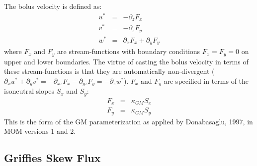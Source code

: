 \documentclass[12pt]{article}
\begin{document}
The bolus velocity is defined as:
\begin{eqnarray}
u^* & = & - \partial_z F_x \\
v^* & = & - \partial_z F_y \\
w^* & = & \partial_x F_x + \partial_y F_y
\end{eqnarray}
where $F_x$ and $F_y$ are stream-functions with boundary conditions
$F_x=F_y=0$ on upper and lower boundaries. The virtue of casting the
bolus velocity in terms of these stream-functions is that they are
automatically non-divergent ($\partial_x u^* + \partial_y v^* = -
\partial_{xz} F_x - \partial_{yz} F_y = - \partial_z w^*$). $F_x$ and
$F_y$ are specified in terms of the isoneutral slopes $S_x$ and $S_y$:
\begin{eqnarray}
F_x & = & \kappa_{GM} S_x \\
F_y & = & \kappa_{GM} S_y
\end{eqnarray}
This is the form of the GM parameterization as applied by Donabasaglu,
1997, in MOM versions 1 and 2.

\subsection{Griffies Skew Flux}
\end{document}
